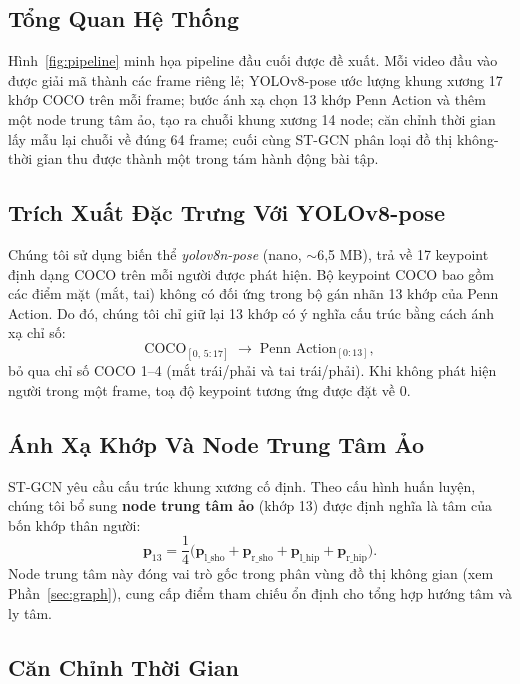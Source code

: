 \documentclass[conference]{IEEEtran}
\begin{document}
\subsection{Tổng Quan Hệ Thống}

Hình~\ref{fig:pipeline} minh họa pipeline đầu cuối được đề xuất. Mỗi video đầu
vào được giải mã thành các frame riêng lẻ; YOLOv8-pose ước lượng khung xương 17
khớp COCO trên mỗi frame; bước ánh xạ chọn 13 khớp Penn Action và thêm một node
trung tâm ảo, tạo ra chuỗi khung xương 14 node; căn chỉnh thời gian lấy mẫu lại
chuỗi về đúng 64 frame; cuối cùng ST-GCN phân loại đồ thị không-thời gian thu
được thành một trong tám hành động bài tập.

\subsection{Trích Xuất Đặc Trưng Với YOLOv8-pose}
\label{sec:yolo}

Chúng tôi sử dụng biến thể \textit{yolov8n-pose} (nano, $\sim$6,5 MB), trả về
17 keypoint định dạng COCO trên mỗi người được phát hiện. Bộ keypoint COCO bao
gồm các điểm mặt (mắt, tai) không có đối ứng trong bộ gán nhãn 13 khớp của Penn
Action. Do đó, chúng tôi chỉ giữ lại 13 khớp có ý nghĩa cấu trúc bằng cách ánh
xạ chỉ số:
\[
  \text{COCO}_{[0,\,5{:}17]} \;\longrightarrow\; \text{Penn Action}_{[0{:}13]},
\]
bỏ qua chỉ số COCO 1--4 (mắt trái/phải và tai trái/phải). Khi không phát hiện
người trong một frame, toạ độ keypoint tương ứng được đặt về 0.

\subsection{Ánh Xạ Khớp Và Node Trung Tâm Ảo}
\label{sec:remap}

ST-GCN yêu cầu cấu trúc khung xương cố định. Theo cấu hình huấn luyện, chúng tôi
bổ sung \textbf{node trung tâm ảo} (khớp 13) được định nghĩa là tâm của bốn khớp
thân người:
\[
  \mathbf{p}_{13} = \frac{1}{4}\bigl(\mathbf{p}_{\text{l\_sho}} +
  \mathbf{p}_{\text{r\_sho}} + \mathbf{p}_{\text{l\_hip}} +
  \mathbf{p}_{\text{r\_hip}}\bigr).
\]
Node trung tâm này đóng vai trò gốc trong phân vùng đồ thị không gian
(xem Phần~\ref{sec:graph}), cung cấp điểm tham chiếu ổn định cho tổng hợp
hướng tâm và ly tâm.

\subsection{Căn Chỉnh Thời Gian}
\label{sec:temporal}
\end{document}
